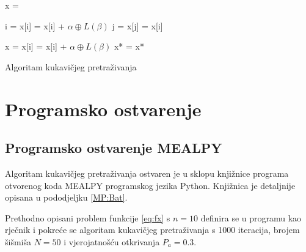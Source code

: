 \begin{algorithm}[H]
	\begin{algorithmic}[1]
		
\State x =  

  

    \State i =  
    \State x[i] = x[i] + $\alpha \oplus L(\beta)$  
    \State j =  
        \State x[j] = x[i] 
    \EndIf
    \EndFor

    
    \State x =    
        \State x[i] = x[i] + $\alpha \oplus L(\beta)$ 
    \EndFor
    \State x* = 
  \EndFor
		\State \Return x*	
		\EndFunction
	\end{algorithmic}
	\caption{Algoritam kukavičjeg pretraživanja}
\end{algorithm}









\section{Programsko ostvarenje}

\subsection{Programsko ostvarenje MEALPY}
\hspace{\parindent}Algoritam kukavičjeg pretraživanja ostvaren je u sklopu knjižnice programa otvorenog koda MEALPY\cite{van2023mealpy} programskog jezika Python. Knjižnica je detaljnije opisana u pododjeljku \ref{MP:Bat}.

\hspace{\parindent}Prethodno opisani problem funkcije \eqref{eq:fx} s $n = 10$ definira se u programu kao rječnik i pokreće se algoritam kukavičjeg pretraživanja s 1000 iteracija, brojem šišmiša $N = 50$ i vjerojatnošću otkrivanja $P_a = 0.3$.

